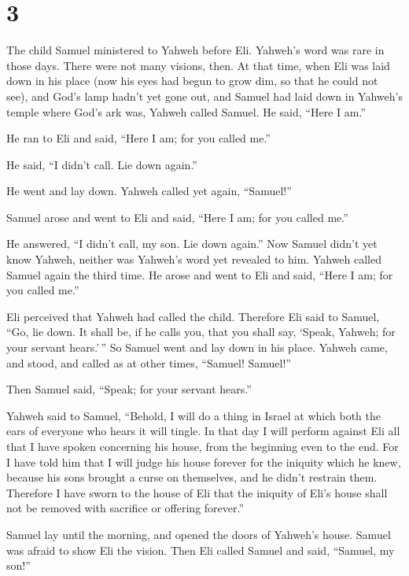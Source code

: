 \hypertarget{section-2}{%
\section{3}\label{section-2}}

 The child Samuel ministered to Yahweh before Eli. Yahweh's
word was rare in those days. There were not many visions, then.
 At that time, when Eli was laid down in his place (now his
eyes had begun to grow dim, so that he could not see),  and
God's lamp hadn't yet gone out, and Samuel had laid down in Yahweh's
temple where God's ark was,  Yahweh called Samuel. He said,
``Here I am.''

 He ran to Eli and said, ``Here I am; for you called me.''

He said, ``I didn't call. Lie down again.''

He went and lay down.  Yahweh called yet again, ``Samuel!''

Samuel arose and went to Eli and said, ``Here I am; for you called me.''

He answered, ``I didn't call, my son. Lie down again.''  Now
Samuel didn't yet know Yahweh, neither was Yahweh's word yet revealed to
him.  Yahweh called Samuel again the third time. He arose
and went to Eli and said, ``Here I am; for you called me.''

Eli perceived that Yahweh had called the child.  Therefore
Eli said to Samuel, ``Go, lie down. It shall be, if he calls you, that
you shall say, `Speak, Yahweh; for your servant hears.'\,'' So Samuel
went and lay down in his place.  Yahweh came, and stood,
and called as at other times, ``Samuel! Samuel!''

Then Samuel said, ``Speak; for your servant hears.''

 Yahweh said to Samuel, ``Behold, I will do a thing in
Israel at which both the ears of everyone who hears it will tingle.
 In that day I will perform against Eli all that I have
spoken concerning his house, from the beginning even to the end.
 For I have told him that I will judge his house forever
for the iniquity which he knew, because his sons brought a curse on
themselves, and he didn't restrain them.  Therefore I have
sworn to the house of Eli that the iniquity of Eli's house shall not be
removed with sacrifice or offering forever.''

 Samuel lay until the morning, and opened the doors of
Yahweh's house. Samuel was afraid to show Eli the vision. 
Then Eli called Samuel and said, ``Samuel, my son!''

